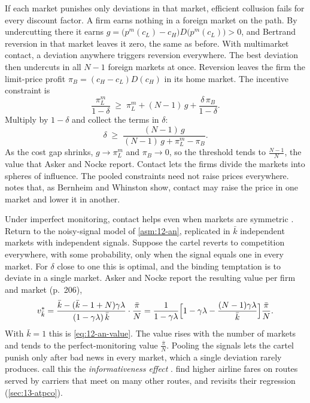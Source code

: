 If each market punishes only deviations in that market, efficient collusion fails for every discount factor. A firm
earns nothing in a foreign market on the path. By undercutting there it earns
$g = \bigl(p^m(c_L) - c_H\bigr)D\bigl(p^m(c_L)\bigr) > 0$, and Bertrand reversion in that market leaves it zero, the
same as before. With multimarket contact, a deviation anywhere triggers reversion everywhere. The best deviation
then undercuts in all $N - 1$ foreign markets at once. Reversion leaves the firm the limit-price profit
$\pi_B = (c_H - c_L)D(c_H)$ in its home market. The incentive constraint is
\begin{equation*}
\frac{\pi_L^m}{1 - \delta} \;\ge\; \pi_L^m + (N - 1)\,g + \frac{\delta\,\pi_B}{1 - \delta} .
\end{equation*}
Multiply by $1 - \delta$ and collect the terms in $\delta$:
\begin{equation*}
\delta \;\ge\; \frac{(N - 1)\,g}{(N - 1)\,g + \pi_L^m - \pi_B} .
\end{equation*}
As the cost gap shrinks, $g \to \pi_L^m$ and $\pi_B \to 0$, so the threshold tends to $\frac{N - 1}{N}$, the value that
Asker and Nocke report. Contact lets the firms divide the markets into spheres of influence. The pooled constraints
need not raise prices everywhere. \citet[ch.~6, note~22]{Tirole1988} notes that, as Bernheim and Whinston show,
contact may raise the price in one market and lower it in another.

Under imperfect monitoring, contact helps even when markets are symmetric \citep{Matsushima2001}. Return to the
noisy-signal model of \cref{asm:12-an}, replicated in $\bar k$ independent markets with independent signals. Suppose
the cartel reverts to competition everywhere, with some probability, only when the signal equals one in every market.
For $\delta$ close to one this is optimal, and the binding temptation is to deviate in a single market. Asker and
Nocke report the resulting value per firm and market (p.~206),
\begin{equation*}
v^*_{\bar k} = \frac{\bar k - (\bar k - 1 + N)\gamma\lambda}{(1 - \gamma\lambda)\,\bar k}\cdot\frac{\bar\pi}{N}
= \frac{1}{1 - \gamma\lambda}\Bigl[1 - \gamma\lambda - \frac{(N - 1)\gamma\lambda}{\bar k}\Bigr]\frac{\bar\pi}{N} .
\end{equation*}
With $\bar k = 1$ this is \eqref{eq:12-an-value}. The value rises with the number of markets and tends to the
perfect-monitoring value $\frac{\bar\pi}{N}$. Pooling the signals lets the cartel punish only after bad news in every
market, which a single deviation rarely produces. \citet{NockeStrausz2020} call this the \emph{informativeness effect}
\citep[p.~207]{AskerNocke2021}. \citet{EvansKessides1994} find higher airline fares on routes served by carriers that
meet on many other routes, and \citet{Miller2010} revisits their regression (\cref{sec:13-atpco}).

